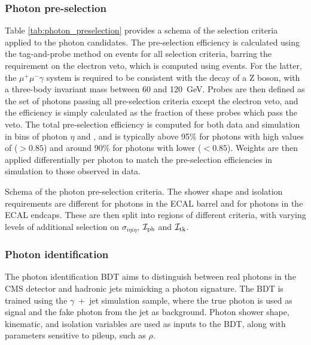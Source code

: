 \subsubsection{Photon pre-selection}\label{sec:photon_preselection}
Table \ref{tab:photon_preselection} provides a schema of the selection criteria applied to the photon candidates. The pre-selection efficiency is calculated using the tag-and-probe method on \Zee events for all selection criteria, barring the requirement on the electron veto, which is computed using \Zmumug events. For the latter, the $\mu^{+}\mu^{-}\gamma$ system is required to be consistent with the decay of a Z boson, with a three-body invariant mass between 60 and 120~GeV. Probes are then defined as the set of photons passing all pre-selection criteria except the electron veto, and the efficiency is simply calculated as the fraction of these probes which pass the veto. The total pre-selection efficiency is computed for both data and simulation in bins of photon $\eta$ and \RNINE, and is typically above 95\% for photons with high values of \RNINE ($>0.85$) and around 90\% for photons with lower \RNINE ($<0.85$). Weights are then applied differentially per photon to match the pre-selection efficiencies in simulation to those observed in data.

\begin{table}[htb!]
    \caption[Schema of the photon pre-selection criteria]{Schema of the photon pre-selection criteria. The shower shape and isolation requirements are different for photons in the ECAL barrel and for photons in the ECAL endcaps. These are then split into regions of different \RNINE criteria, with varying levels of additional selection on $\sigma_{i\eta i\eta}$, $\mathcal{I}_{\rm{ph}}$ and $\mathcal{I}_{\rm{tk}}$.}
    \label{tab:photon_preselection}
    \vspace{.5cm}
    \centering
    \scriptsize
    \renewcommand{\arraystretch}{1.5}
    
\end{table}


\subsubsection{Photon identification}
The photon identification BDT aims to distinguish between real photons in the CMS detector and hadronic jets mimicking a photon signature. The BDT is trained using the $\gamma$~+~jet simulation sample, where the true photon is used as signal and the fake photon from the jet as background. Photon shower shape, kinematic, and isolation variables are used as inputs to the BDT, along with parameters sensitive to pileup, such as $\rho$. 

